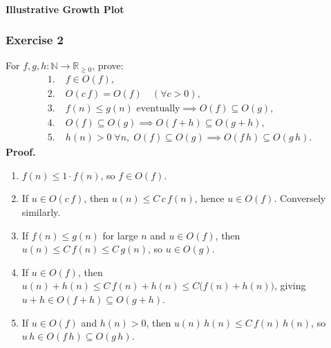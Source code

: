 \documentclass{article}
\theoremstyle{theorem}
\theoremstyle{definition}
\theoremstyle{remark}
\begin{document}
\paragraph{Illustrative Growth Plot}
\begin{center}
\end{center}


\subsubsection*{Exercise 2}
For \(f,g,h\colon\mathbb N\to\mathbb R_{\ge0}\), prove:
\[
\begin{aligned}
1.\;&f\in O(f),\\
2.\;&O(c\,f)=O(f)\quad(\forall c>0),\\
3.\;&f(n)\le g(n)\text{ eventually}\implies O(f)\subseteq O(g),\\
4.\;&O(f)\subseteq O(g)\implies O(f+h)\subseteq O(g+h),\\
5.\;&h(n)>0\;\forall n,\;O(f)\subseteq O(g)\implies O(f\,h)\subseteq O(g\,h).
\end{aligned}
\]
\textbf{Proof.}
\begin{enumerate}[label=\arabic*.]
  \item \(f(n)\le1\cdot f(n)\), so \(f\in O(f)\).
  \item If \(u\in O(c\,f)\), then \(u(n)\le C\,c\,f(n)\), hence \(u\in O(f)\).  Conversely similarly.
  \item If \(f(n)\le g(n)\) for large \(n\) and \(u\in O(f)\), then \(u(n)\le C\,f(n)\le C\,g(n)\), so \(u\in O(g)\).
  \item If \(u\in O(f)\), then \(u(n)+h(n)\le C\,f(n)+h(n)\le C\bigl(f(n)+h(n)\bigr)\), giving \(u+h\in O(f+h)\subseteq O(g+h)\).
  \item If \(u\in O(f)\) and \(h(n)>0\), then \(u(n)\,h(n)\le C\,f(n)\,h(n)\), so \(u\,h\in O(f\,h)\subseteq O(g\,h)\).
\end{enumerate}
\end{document}
